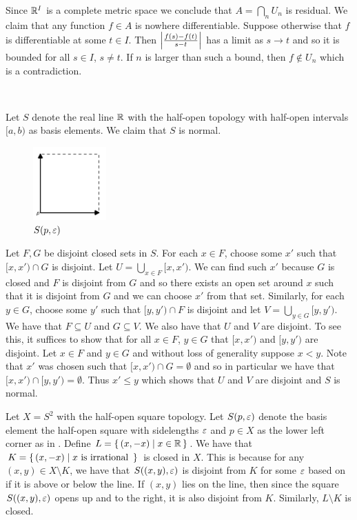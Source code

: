 \documentclass[letterpaper, 11pt, oneside]{book}
\begin{document}
\begin{pf}
  Since $\mathbb{R}^{I}$ is a complete metric space  we conclude that $A = \bigcap_{n} U_{n}$ is residual.
  We claim that any function $f \in A$ is nowhere differentiable.
  Suppose otherwise that $f$ is differentiable at some $t \in I$.
  Then $\abs{\frac{f(s) - f(t)}{s - t}}$ has a limit as $s \to t$ and so it is bounded for all $s \in I$, $s \neq t$.
  If $n$ is larger than such a bound, then $f \notin U_{n}$ which is a contradiction.
\end{pf}

\begin{ex}\

  Let $S$ denote the real line $\mathbb{R}$ with the half-open topology with half-open intervals $[a, b)$ as basis elements.
  We claim that $S$ is normal.
  \begin{figure}[h]
    \centering
    \includegraphics[width=0.25\textwidth]{figs/Sorgengrey_Half_Open.png}
    \caption{$S(p, \varepsilon)$}\label{fig:sorgenfrey_half_open}
  \end{figure}
  Let $F, G$ be disjoint closed sets in $S$.
  For each $x \in F$, choose some $x'$ such that $[x, x') \cap G$ is disjoint.
  Let $U = \bigcup_{x \in F}[x, x')$.
  We can find such $x'$ because $G$ is closed and $F$ is disjoint from $G$ and so there exists an open set around $x$ such that it is disjoint from $G$ and we can choose $x'$ from that set.
  Similarly, for each $y \in G$, choose some $y'$ such that $[y, y') \cap F$ is disjoint and let $V = \bigcup_{y \in G}[y, y')$.
  We have that $F \subseteq U$ and $G \subseteq V$.
  We also have that $U$ and $V$ are disjoint.
  To see this, it suffices to show that for all $x \in F$, $y \in G$ that $[x, x')$ and $[y, y')$ are disjoint.
  Let $x \in F$ and $y \in G$ and without loss of generality suppose $x < y$.
  Note that $x'$ was chosen such that $[x, x') \cap G = \emptyset$ and so in particular we have that $[x, x') \cap [y, y') = \emptyset$.
  Thus $x' \leq y$ which shows that $U$ and $V$ are disjoint and $S$ is normal.

  Let $X = S^{2}$ with the half-open square topology.
  Let $S(p, \varepsilon)$ denote the basis element the half-open square with sidelengths $\varepsilon$ and $p \in X$ as the lower left corner as in .
  Define $L = \set{(x, -x) | x \in \mathbb{R}}$.
  We have that $K = \set{(x, -x) | x \text{ is irrational }}$ is closed in $X$.
  This is because for any $(x, y) \in X \setminus K$, we have that $S((x, y), \varepsilon)$ is disjoint from $K$ for some $\varepsilon$ based on if it is above or below the line.
  If $(x, y)$ lies on the line, then since the square $S((x, y), \varepsilon)$ opens up and to the right, it is also disjoint from $K$.
  Similarly, $L \setminus K$ is closed.


\end{ex}
\end{document}
